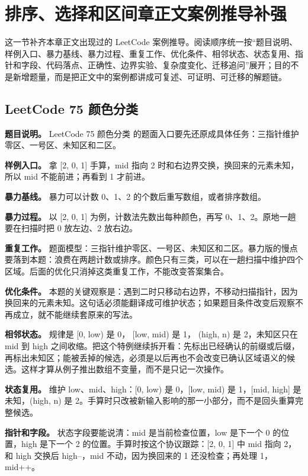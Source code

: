 \section{排序、选择和区间章正文案例推导补强}

这一节补齐本章正文出现过的 LeetCode 案例推导。阅读顺序统一按“题目说明、样例入口、暴力基线、暴力过程、重复工作、优化条件、相邻状态、状态复用、指针和字段、代码落点、正确性、边界实验、复杂度变化、迁移追问”展开；目的不是新增题量，而是把正文中的案例都讲成可复述、可证明、可迁移的解题链。

\subsection{LeetCode 75 颜色分类}

\textbf{题目说明。} LeetCode 75 颜色分类 的题面入口要先还原成具体任务：三指针维护零区、一号区、未知区和二区。

\textbf{样例入口。} 拿 [2, 0, 1] 手算，mid 指向 2 时和右边界交换，换回来的元素未知，所以 mid 不能前进；再看到 1 才前进。

\textbf{暴力基线。} 暴力可以计数 0、1、2 的个数后重写数组，或者排序数组。

\textbf{暴力过程。} 以 [2, 0, 1] 为例，计数法先数出每种颜色，再写 0、1、2。原地一趟要在扫描时把 0 放左边、2 放右边。

\textbf{重复工作。} 题面模型：三指针维护零区、一号区、未知区和二区。暴力版的慢点要落到本题：浪费在两趟计数或排序。颜色只有三类，可以在一趟扫描中维护四个区域。后面的优化只消掉这类重复工作，不能改变答案集合。

\textbf{优化条件。} 本题的关键观察是：遇到二时只移动右边界，不移动扫描指针，因为换回来的元素未知。这句话必须能翻译成可维护状态；如果题目条件改变后观察不再成立，就不能继续套原来的写法。

\textbf{相邻状态。} 规律是 [0, low) 是 0， [low, mid) 是 1， (high, n) 是 2，未知区只在 mid 到 high 之间收缩。把这个特例继续拆开看：先标出已经确认的前缀或后缀，再标出未知区；能被丢掉的候选，必须是以后再也不会改变已确认区域语义的候选。这样才算从例子推出数组不变量，而不是只记一次操作。

\textbf{状态复用。} 维护 low、mid、high：[0, low) 是 0，[low, mid) 是 1，[mid, high] 是未知，(high, n) 是 2。手算时只改被新输入影响的那一小部分，而不是回头重算完整候选。

\textbf{指针和字段。} 状态字段要能说清：mid 是当前检查位置，low 是下一个 0 的位置，high 是下一个 2 的位置。手算时按这个协议跟踪：[2, 0, 1] 中 mid 指向 2，和 high 交换后 high--，mid 不动，因为换回来的 1 还没检查；再处理 1，mid++。

